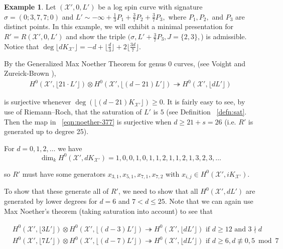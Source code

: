 \documentclass{amsart}
\theoremstyle{plain}
\theoremstyle{definition}
\newtheorem{example}[thm]{Example}
\theoremstyle{remark}
\numberwithin{equation}{section}
\newcommand\sx{\mathscr X}
\newcommand{\halfcan}{L}
\begin{document}
\begin{example}
\label{eg:base-0-377}
Let $(\sx',0, \halfcan')$ be a log spin curve with signature $\sigma =
(0; 3, 7, 7; 0)$ and $\halfcan' \sim -\infty + \frac{1}{3} P_1 +
\frac{3}{7} P_2 + \frac{3}{7} P_3,$ where $P_1,P_2,$ and $P_3$ are
distinct points. In this example, we will exhibit a minimal
presentation for $R' = R(\sx',0, \halfcan')$ and show the triple
$(\sigma, \halfcan' + \frac{3}{7} P_3, J = \{2, 3\},$) is admissible.
Notice that $\deg \lfloor d K_{\sx'} \rfloor= -d + \lfloor \frac{d}{3}
\rfloor + 2 \lfloor \frac{3d}{7} \rfloor$.

By the Generalized Max Noether Theorem for genus 0 curves, (see Voight
and Zureick-Brown \cite[Lemma 3.1.1]{vzb:stacky}),
\begin{align}
\label{eqn:noether-377}
	H^0 (\sx', \lfloor 21 \cdot \halfcan' \rfloor) \otimes H^0 (\sx', \lfloor
	(d - 21) \halfcan' \rfloor) \twoheadrightarrow H^0 (\sx', \lfloor
	d \halfcan' \rfloor)
\end{align}

\noindent
is surjective whenever $\deg (\lfloor (d - 21) K_{\sx'} \rfloor)
\geq 0$. It is fairly easy to see, by use of Riemann--Roch, that
the saturation of $\halfcan'$ is $5$ (see Definition ~\ref{defn:sat}.
Then the map in ~\eqref{eqn:noether-377} is surjective when $d \geq
21 + s = 26$ (i.e. $R'$ is generated up to degree 25).

For $d = 0, 1, 2, \ldots$ we have
\[
	\dim_k H^0 (\sx', d K_{\sx'}) = 1, 0, 0, 1, 0, 1, 1, 2, 1, 1, 2, 1, 3, 2, 3, \ldots
\]

\noindent
so $R'$ must have some generators $x_{3, 1}, x_{5, 1}, x_{7, 1},
x_{7, 2}$ with $x_{i, j} \in H^0(\sx', i K_{\sx'})$.

To show that these generate all of $R'$, we need to show that all
$H^0 (\sx', d \halfcan')$ are generated by lower degrees for $d = 6$
and $7 < d \leq 25$. Note that we can again use Max Noether's theorem
(taking saturation into account) to see that

\begin{align*}
	&H^0 (\sx', \lfloor 3 \halfcan' \rfloor) \otimes H^0 (\sx', \lfloor
	(d - 3) \halfcan' \rfloor) \twoheadrightarrow H^0 (\sx', \lfloor
	d \halfcan' \rfloor) \text{ if } d \geq 12 \text{ and } 3 \nmid d \\
	&H^0 (\sx', \lfloor 7 \halfcan' \rfloor) \otimes H^0 (\sx', \lfloor
	(d - 7) \halfcan' \rfloor) \twoheadrightarrow H^0 (\sx', \lfloor
	d \halfcan' \rfloor) \text{ if } d \geq 6, d \not\equiv 0, 5
	\bmod 7
\end{align*}


\end{example}
\end{document}
